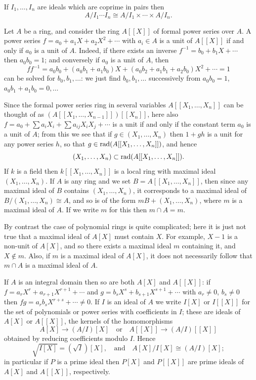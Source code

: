 \begin{theorem}\label{thm:1.4}
If $I_1, \ldots, I_n$ are ideals which are coprime in pairs then
\[
  A/I_1 \cdots I_n \cong A/I_1 \times \cdots \times A/I_n.
\]
\end{theorem}

\begin{example}\label{ex:1.1}
Let $A$ be a ring, and consider the ring $A[[X]]$ of formal power
series over $A$. A power series $f = a_0 + a_1X + a_2X^2 + \cdots$ with $a_i \in A$ is a
unit of $A[[X]]$ if and only if $a_0$ is a unit of $A$. Indeed, if there exists an
inverse $f^{-1} = b_0 + b_1X + \cdots$ then $a_0b_0 = 1$; and conversely if $a_0$ is a unit of $A$, then
\[
  ff^{-1} = a_0b_0 + (a_0b_1 + a_1b_0)X + (a_0b_2 + a_1b_1 + a_2b_0)X^2 + \cdots = 1
\]
can be solved for $b_0, b_1, \ldots$: we just find $b_0, b_1, \ldots$ successively from
$a_0b_0 = 1$, $a_0b_1 + a_1b_0 = 0, \ldots$

Since the formal power series ring in several variables $A[[X_1, \ldots, X_n]]$ can be thought of as
$(A[[X_1, \ldots, X_{n-1}]])[[X_n]]$, here also $f = a_0 + \sum a_iX_i + \sum a_{ij}X_iX_j + \cdots$ is a unit
if and only if the constant term $a_0$ is a unit of $A$; from this we see that
if $g \in (X_1, \ldots, X_n)$ then $1 + gh$ is a unit for any power series $h$, so that
$g \in \operatorname{rad}(A[[X_1, \ldots, X_n]])$, and hence
\[
  (X_1, \ldots, X_n) \subset \operatorname{rad}(A[[X_1, \ldots, X_n]]).
\]
If $k$ is a field then $k[[X_1, \ldots, X_n]]$ is a local ring with maximal ideal
$(X_1, \ldots, X_n)$. If $A$ is any ring and we set $B = A[[X_1, \ldots, X_n]]$, then since
any maximal ideal of $B$ contains $(X_1, \ldots, X_n)$, it corresponds to a maximal
ideal of $B/(X_1, \ldots, X_n) \cong A$, and so is of the form $mB + (X_1, \ldots, X_n)$, where
$m$ is a maximal ideal of $A$. If we write $m$ for this then $m \cap A = m$.

By contrast the case of polynomial rings is quite complicated; here it
is just not true that a maximal ideal of $A[X]$ must contain $X$. For example,
$X - 1$ is a non-unit of $A[X]$, and so there exists a maximal ideal $m$
containing it, and $X \notin m$. Also, if $m$ is a maximal ideal of $A[X]$, it does
not necessarily follow that $m \cap A$ is a maximal ideal of $A$.

If $A$ is an integral domain then so are both $A[X]$ and $A[[X]]$: if
$f = a_rX^r + a_{r+1}X^{r+1} + \cdots$ and $g = b_sX^s + b_{s+1}X^{s+1} + \cdots$ with $a_r \neq 0$,
$b_s \neq 0$ then $fg = a_rb_sX^{r+s} + \cdots \neq 0$. If $I$ is an ideal of $A$ we write $I[X]$ or
$I[[X]]$ for the set of polynomials or power series with coefficients in $I$;
these are ideals of $A[X]$ or $A[[X]]$, the kernels of the homomorphisms
\[
  A[X] \to (A/I)[X] \quad \text{or} \quad A[[X]] \to (A/I)[[X]]
\]
obtained by reducing coefficients modulo $I$. Hence
\[
  \sqrt{I[X]} = (\sqrt{I})[X], \quad \text{and} \quad A[X]/I[X] \cong (A/I)[X];
\]
in particular if $P$ is a prime ideal then $P[X]$ and $P[[X]]$ are prime ideals
of $A[X]$ and $A[[X]]$, respectively.


\end{example}
